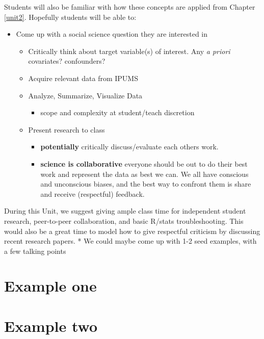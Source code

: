 \documentclass[
]{book}
\providecommand{\tightlist}{%
  \setlength{\itemsep}{0pt}\setlength{\parskip}{0pt}}
\begin{document}
Students will also be familiar with how these concepts are applied from Chapter \ref{unit2}. Hopefully students will be able to:

\begin{itemize}
\tightlist
\item
  Come up with a social science question they are interested in

  \begin{itemize}
  \tightlist
  \item
    Critically think about target variable(s) of interest. Any \emph{a priori} covariates? confounders?
  \item
    Acquire relevant data from IPUMS
  \item
    Analyze, Summarize, Visualize Data

    \begin{itemize}
    \tightlist
    \item
      scope and complexity at student/teach discretion
    \end{itemize}
  \item
    Present research to class

    \begin{itemize}
    \tightlist
    \item
      \textbf{potentially} critically discuss/evaluate each others work.
    \item
      \textbf{science is collaborative} everyone should be out to do their best work and represent the data as best we can. We all have conscious and unconscious biases, and the best way to confront them is share and receive (respectful) feedback.
    \end{itemize}
  \end{itemize}
\end{itemize}

During this Unit, we suggest giving ample class time for independent student research, peer-to-peer collaboration, and basic R/stats troubleshooting. This would also be a great time to model how to give respectful criticism by discussing recent research papers.
* We could maybe come up with 1-2 seed examples, with a few talking points

\hypertarget{example-one}{%
\section{Example one}\label{example-one}}

\hypertarget{example-two}{%
\section{Example two}\label{example-two}}
\end{document}
